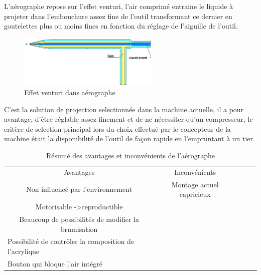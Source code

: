 L'aérographe repose sur l'effet venturi, l'air comprimé entraine le liquide à projeter dans l'embouchure assez fine de l'outil
transformant ce dernier en goutelettes plus ou moins fines en fonction du réglage de l'aiguille de l'outil.

\begin{figure}[H]
    \centering
    \includegraphics[width=0.6\textwidth]{assets/figures/etat_art/effet_venturi_aerographe.jpg}
    \caption[Effet venturi dans aérographe]{Effet venturi dans aérographe \cite{venturi_airbrush}\footnotemark}
\end{figure}

C'est la solution de projection selectionnée dans la machine actuelle, il a pour avantage, d'être réglable assez finement
et de ne nécessiter qu'un compresseur, le critère de selection principal lors du choix effectué par le concepteur de la machine
était la disponibilité de l'outil de façon rapide en l'empruntant à un tier.

\begin{table}[H]
    \centering
    \begin{tabular}{|c|c|lll}
        \cline{1-2}
        Avantages                                                                                            & Inconvénients                                     &  &  & \\ \cline{1-2}
        \cellcolor[HTML]{67FD9A}Non influencé par l'environnement                                            & \cellcolor[HTML]{FD6864}Montage actuel capricieux &  &  & \\ \cline{1-2}
        \cellcolor[HTML]{67FD9A}Motorisable -\textgreater reproductible                                      & \cellcolor[HTML]{FFFFFF}                          &  &  & \\ \cline{1-2}
        \cellcolor[HTML]{67FD9A}Beaucoup de possibilités de modifier la brumisation                          & \cellcolor[HTML]{FFFFFF}                          &  &  & \\ \cline{1-2}
        \multicolumn{1}{|l|}{\cellcolor[HTML]{67FD9A}Possibilité de contrôler la composition de l'acrylique} & \multicolumn{1}{l|}{}                             &  &  & \\ \cline{1-2}
        \multicolumn{1}{|l|}{\cellcolor[HTML]{67FD9A}Bouton qui bloque l'air intégré}                        & \multicolumn{1}{l|}{}                             &  &  & \\ \cline{1-2}
    \end{tabular}
    \caption{Résumé des avantages et inconvénients de l'aérographe}
    \label{tab:aerographe_table}
\end{table}
